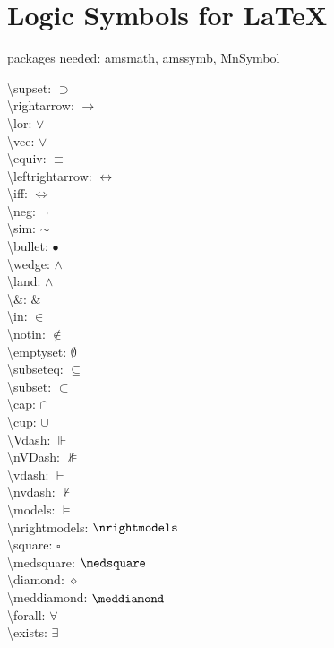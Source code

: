 \documentclass[12pt]{article}
\begin{document}
\section*{Logic Symbols for \LaTeX}
packages needed: amsmath, amssymb, MnSymbol\\
\begin{multicols}{2}
\Large
\textbackslash supset: $\supset$\\
\textbackslash rightarrow: $\rightarrow$\\
\textbackslash lor: $\lor$\\
\textbackslash vee: $\vee$\\
\textbackslash equiv: $\equiv$\\
\textbackslash leftrightarrow: $\leftrightarrow$\\
\textbackslash iff: $\iff$\\
\textbackslash neg: $\neg$\\
\textbackslash sim: $\sim$\\
\textbackslash bullet: $\bullet$\\
\textbackslash wedge: $\wedge$\\
\textbackslash land: $\land$\\
\textbackslash \&: $\&$\\
\textbackslash in: $\in$\\
\textbackslash notin: $\notin$\\
\textbackslash emptyset: $\emptyset$\\
\textbackslash subseteq: $\subseteq$\\
\textbackslash subset: $\subset$\\
\textbackslash cap: $\cap$\\
\textbackslash cup: $\cup$\\
\textbackslash Vdash: $\Vdash$\\
\textbackslash nVDash: $\nVDash$\\
\textbackslash vdash: $\vdash$\\
\textbackslash nvdash: $\nvdash$\\
\textbackslash models: $\models$\\
\textbackslash nrightmodels: $\nrightmodels$\\
\textbackslash square: $\square$\\
\textbackslash medsquare: $\medsquare$\\
\textbackslash diamond: $\diamond$\\
\textbackslash meddiamond: $\meddiamond$\\
\textbackslash forall: $\forall$\\
\textbackslash exists: $\exists$\\
\end{multicols}
\end{document}
